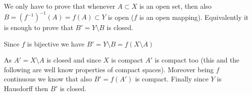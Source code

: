 \documentclass[12pt]{article}
\begin{document}
We only have to prove that whenever $A\subset X$ is an open set, then also $B=(f^{-1})^{-1}(A) = f(A) \subset Y$ is open ($f$ is an open mapping). Equivalently it is enough to prove that $B'=Y\setminus B$ is closed. 

Since $f$ is bijective we have $B' = Y\setminus B = f(X\setminus A)$

As $A'=X\setminus A$ is closed and since $X$ is compact $A'$ is compact too (this and the following are well know properties of compact spaces).
Moreover being $f$ continuous we know that also $B'=f(A')$ is compact. Finally since $Y$ is Hausdorff then $B'$ is closed.
\end{document}

